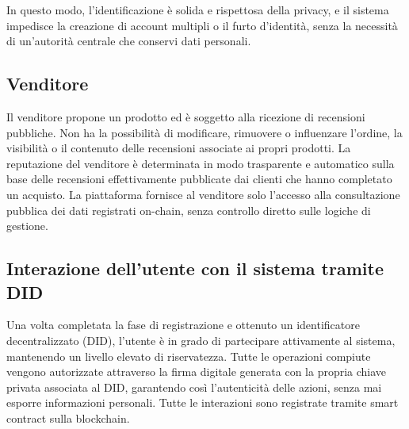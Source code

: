                 \noindent In questo modo, l'identificazione è solida e rispettosa della privacy, e il sistema impedisce la creazione di account multipli o il furto d'identità, senza la necessità di un'autorità centrale che conservi dati personali.
            
        \subsection{Venditore}
            Il venditore propone un prodotto ed è soggetto alla ricezione di recensioni pubbliche. Non ha la possibilità di modificare, rimuovere o influenzare l'ordine, la visibilità o il contenuto delle recensioni associate ai propri prodotti. La reputazione del venditore è determinata in modo trasparente e automatico sulla base delle recensioni effettivamente pubblicate dai clienti che hanno completato un acquisto.
            La piattaforma fornisce al venditore solo l'accesso alla consultazione pubblica dei dati registrati on-chain, senza controllo diretto sulle logiche di gestione.
            
        \subsection{Interazione dell'utente con il sistema tramite DID}
            Una volta completata la fase di registrazione e ottenuto un identificatore decentralizzato (DID), l'utente è in grado di partecipare attivamente al sistema, mantenendo un livello elevato di riservatezza. Tutte le operazioni compiute vengono autorizzate attraverso la firma digitale generata con la propria chiave privata associata al DID, garantendo così l'autenticità delle azioni, senza mai esporre informazioni personali. Tutte le interazioni sono registrate tramite smart contract sulla blockchain.

